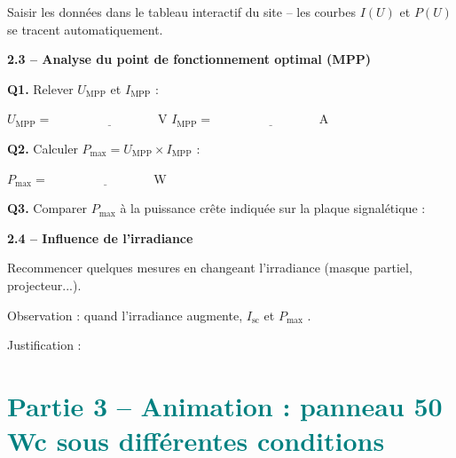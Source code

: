 \documentclass[a4paper, 11pt, oneside]{article}
\newcommand{\question}[1]{\textcolor{bleucol}{\textbf{#1}}}
\begin{document}
\vspace{0.6cm}
Saisir les données dans le tableau interactif du site -- les courbes $I(U)$ et $P(U)$ se tracent automatiquement.

\vspace{0.8cm}

\question{2.3 -- Analyse du point de fonctionnement optimal (MPP)}

\begin{tcolorbox}[colback=cyancol!10, colframe=cyancol]
\textbf{Q1.} Relever $U_{\text{MPP}}$ et $I_{\text{MPP}}$ :
\vspace{0.3cm}

$U_{\text{MPP}} = \quad \underline{\hspace{3cm}}$ V \qquad $I_{\text{MPP}} = \quad \underline{\hspace{3cm}}$ A

\vspace{0.4cm}
\textbf{Q2.} Calculer $P_{\max} = U_{\text{MPP}} \times I_{\text{MPP}}$ :
\vspace{0.3cm}

$P_{\max} = \quad \underline{\hspace{3cm}}$ W

\vspace{0.4cm}
\textbf{Q3.} Comparer $P_{\max}$ à la puissance crête indiquée sur la plaque signalétique :

\vspace{1.2cm}
\end{tcolorbox}

\vspace{0.6cm}

\question{2.4 -- Influence de l'irradiance}

Recommencer quelques mesures en changeant l'irradiance (masque partiel, projecteur...).

\vspace{0.3cm}
Observation : quand l'irradiance augmente, $I_{\text{sc}}$ et $P_{\max}$ \underline{\hspace{4cm}}.

Justification :

\vspace{1.2cm}

\newpage

\section{\textcolor{teal}{Partie 3 -- Animation : panneau 50 Wc sous différentes conditions}}
\end{document}
